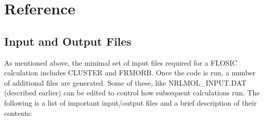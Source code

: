 \documentclass[letterpaper,10pt,english,openany,oneside]{sphinxmanual}
\begin{document}
\sphinxstepscope


\chapter{Reference}
\label{\detokenize{docs/Reference/toc:reference}}\label{\detokenize{docs/Reference/toc::doc}}
\sphinxstepscope


\section{Input and Output Files}
\label{\detokenize{docs/Reference/files:input-and-output-files}}\label{\detokenize{docs/Reference/files:nrlmolfiles}}\label{\detokenize{docs/Reference/files::doc}}
\sphinxAtStartPar
As mentioned above, the minimal set of input files required for a FLOSIC calculation includes CLUSTER and FRMORB.
Once the code is run, a number of additional files are generated. Some of these, like NRLMOL\_INPUT.DAT (described earlier) can be edited to control how subsequent calculations run. The following is a list of important input/output files and a brief description of their contents:
\end{document}
